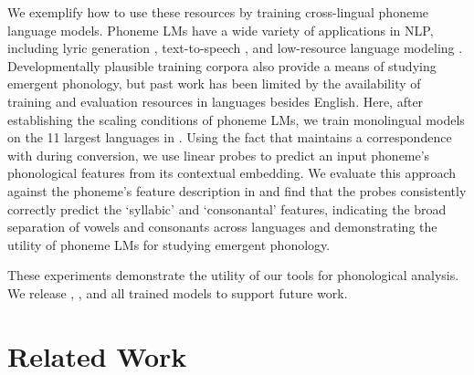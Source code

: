 We exemplify how to use these resources by training cross-lingual phoneme language models. Phoneme LMs have a wide variety of applications in NLP, including lyric generation \citep{ding-2024-songcomposer}, text-to-speech \citep{li-2023-phoneme-level-bert}, and low-resource language modeling \citep{leong-whitenack-2022-phone}. Developmentally plausible training corpora also provide a means of studying emergent phonology, but past work has been limited by the availability of training and evaluation resources in languages besides English. Here, after establishing the scaling conditions of phoneme LMs, we train monolingual models on the 11 largest languages in \ipachildes. Using the fact that \corpusphonemizer maintains a correspondence with \phoible during conversion, we use linear probes to predict an input phoneme's phonological features from its contextual embedding. We evaluate this approach against the phoneme's feature description in \phoible and find that the probes consistently correctly predict the `syllabic' and `consonantal' features, indicating the broad separation of vowels and consonants across languages and demonstrating the utility of phoneme LMs for studying emergent phonology.

These experiments demonstrate the utility of our tools for phonological analysis. We release \corpusphonemizer, \ipachildes, and all trained models to support future work.


\section{Related Work}




